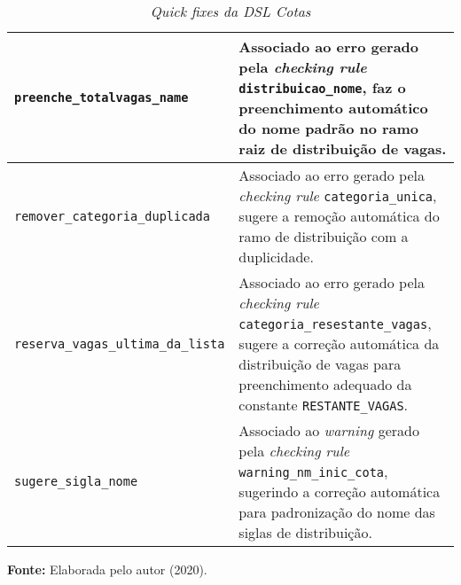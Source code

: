 \begin{table}[ht]
\caption{\textit{Quick fixes da DSL Cotas}}
\label{tblquickfixes}
\centering

\begin{tabular}{|p{6cm}|p{9cm}|}
\hline
\texttt{preenche\_totalvagas\_name} & Associado ao erro gerado pela \textit{checking rule} \texttt{distribuicao\_nome}, faz o preenchimento automático do nome padrão no ramo raiz de distribuição de vagas.                                                                                      \\ \hline
\texttt{remover\_categoria\_duplicada} & Associado ao erro gerado pela \textit{checking rule} \texttt{categoria\_unica}, sugere a remoção automática do ramo de distribuição com a duplicidade.

\\ \hline
\texttt{reserva\_vagas\_ultima\_da\_lista} & Associado ao erro gerado pela \textit{checking rule} \texttt{categoria\_resestante\_vagas}, sugere a correção automática da distribuição de vagas para preenchimento adequado da constante \texttt{RESTANTE\_VAGAS}.

\\ \hline
\texttt{sugere\_sigla\_nome} & Associado ao \textit{warning} gerado pela \textit{checking rule} \texttt{warning\_nm\_inic\_cota}, sugerindo a correção automática para padronização do nome das siglas de distribuição.
                  \\ \hline      

\end{tabular}

  \par\medskip\textbf{Fonte:} Elaborada pelo autor (2020). \par\medskip
\end{table}

